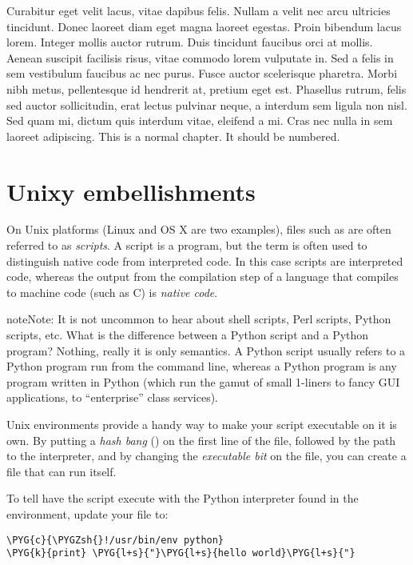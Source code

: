 \documentclass[12pt]{memoir}
\begin{document}
Curabitur eget velit lacus, vitae dapibus felis. Nullam a velit nec arcu ultricies tincidunt. Donec laoreet diam eget magna laoreet egestas. Proin bibendum lacus lorem. Integer mollis auctor rutrum. Duis tincidunt faucibus orci at mollis. Aenean suscipit facilisis risus, vitae commodo lorem vulputate in. Sed a felis in sem vestibulum faucibus ac nec purus. Fusce auctor scelerisque pharetra. Morbi nibh metus, pellentesque id hendrerit at, pretium eget est. Phasellus rutrum, felis sed auctor sollicitudin, erat lectus pulvinar neque, a interdum sem ligula non nisl. Sed quam mi, dictum quis interdum vitae, eleifend a mi. Cras nec nulla in sem laoreet adipiscing.
This is a normal chapter. It should be numbered.

\section{Unixy embellishments}
\label{rst/begpy:unixy-embellishments}
On Unix platforms (Linux and OS X are two examples), files such as
 are often referred to as \emph{scripts}. A script is a
program, but the term is often used to distinguish native code from
interpreted code. In this case scripts are interpreted code, whereas
the output from the compilation step of a language that compiles to
machine code (such as C) is \emph{native code}.

\begin{notice}{note}{Note:}
It is not uncommon to hear about shell scripts, Perl scripts, Python
scripts, etc. What is the difference between a Python script and a
Python program? Nothing, really it is only semantics. A Python script
usually refers to a Python program run from the command line,
whereas a Python program is any program written in Python (which
run the gamut of small 1-liners to fancy GUI applications, to
“enterprise” class services).
\end{notice}

Unix environments provide a handy way to make your script executable
on it is own. By putting a \emph{hash bang} (\code{\#!}) on the first line of
the file, followed by the path to the interpreter, and by changing the
\emph{executable bit} on the file, you can create a file that can run
itself.

To tell have the script execute with the Python interpreter found in
the environment, update your  file to:

\begin{Verbatim}[commandchars=\\\{\}]
\PYG{c}{\PYGZsh{}!/usr/bin/env python}
\PYG{k}{print} \PYG{l+s}{"}\PYG{l+s}{hello world}\PYG{l+s}{"}
\end{Verbatim}
\end{document}
